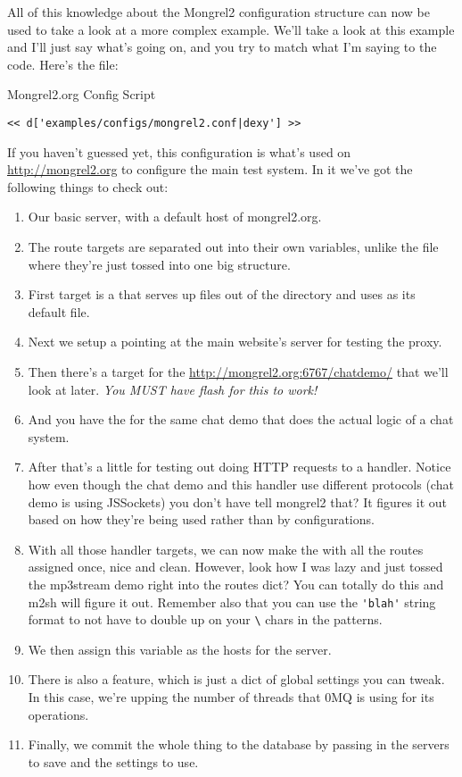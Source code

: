 All of this knowledge about the Mongrel2 configuration structure can now be used to take a look at
a more complex example.  We'll take a look at this example and I'll just say what's
going on, and you try to match what I'm saying to the code.  Here's the  file:

\begin{code}{Mongrel2.org Config Script}
\begin{lstlisting}
<< d['examples/configs/mongrel2.conf|dexy'] >>
\end{lstlisting}
\end{code}

If you haven't guessed yet, this configuration is what's used on \url{http://mongrel2.org}
to configure the main test system.  In it we've got the following things to check out:

\begin{enumerate}
\item Our basic server, with a default host of mongrel2.org.
\item The route targets are separated out into their own variables, unlike the  file
    where they're just tossed into one big structure.
\item First target is a  that serves up files out of the  directory and uses 
    as its default file.
\item Next we setup a  pointing at the main website's server for testing the proxy.
\item Then there's a  target for the \url{http://mongrel2.org:6767/chatdemo/} that we'll look at later. \emph{You MUST have flash for this to work!}
\item And you have the  for the same chat demo that does the actual logic of a chat system.
\item After that's a little  for testing out doing HTTP requests to a handler.  Notice how even
    though the chat demo and this handler use different protocols (chat demo is using JSSockets) you don't have
    tell mongrel2 that?  It figures it out based on how they're being used rather than by configurations.
\item With all those handler targets, we can now make the   with all the routes
    assigned once, nice and clean.  However, look how I was lazy and just tossed the mp3stream demo
    right into the routes dict?  You can totally do this and m2sh will figure it out.  Remember also that
    you can use the \verb|'blah'| string format to not have to double up on your \verb|\| chars in the patterns.
\item We then assign this  variable as the hosts for the  server.
\item There is also a  feature, which is just a dict of global settings you can tweak.  In this case,
    we're upping the number of threads that 0MQ is using for its operations.
\item Finally, we commit the whole thing to the database by passing in the servers to save and the settings
    to use.
\end{enumerate}

